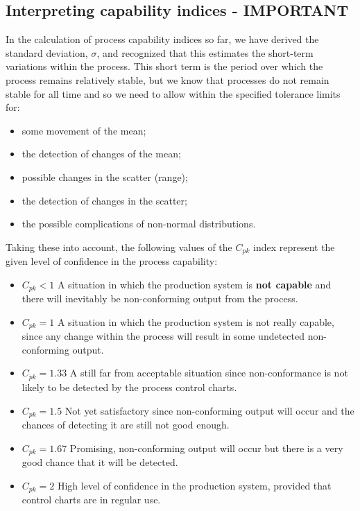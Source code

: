 \documentclass[MASTER-SPC.tex]{subfiles}
\begin{document}
					\subsection*{Interpreting capability indices - IMPORTANT}
					In the calculation of process capability indices so far, we have derived the
					standard deviation, $\sigma$, and recognized that this estimates the short-term variations within the process. This short term is the period over which the process remains relatively stable, but we know that processes do not remain stable for all time and so we need to allow within the specified tolerance limits for:
					
					\begin{itemize}
						\item	some movement of the mean;
						\item	the detection of changes of the mean;
						\item	possible changes in the scatter (range);
						\item	the detection of changes in the scatter;
						\item	the possible complications of non-normal distributions.
					\end{itemize}
					Taking these into account, the following values of the $C_{pk}$ index represent the given level of confidence in the process capability:
					
					\begin{itemize}
						\item	$C_{pk} < 1$ A situation in which the production system is \textbf{not capable} and there will inevitably be non-conforming output from the process.
						
						\item	$C_{pk} = 1$ A situation in which the production system is not really capable, since any change within the process will result in some undetected non-conforming output.
						
						\item	$C_{pk} = 1.33$ A still far from acceptable situation since non-conformance is not likely to be detected by the process control charts.
						
						\item	$C_{pk} = 1.5$ Not yet satisfactory since non-conforming output will occur and the chances of detecting it are still not good enough.
						
						\item	$C_{pk} = 1.67$ Promising, non-conforming output will occur but there is a very good chance that it will be detected.
						
						\item	$C_{pk} = 2$ High level of confidence in the production system, provided that control charts are in regular use.
						
					\end{itemize}
\newpage
\end{document}
